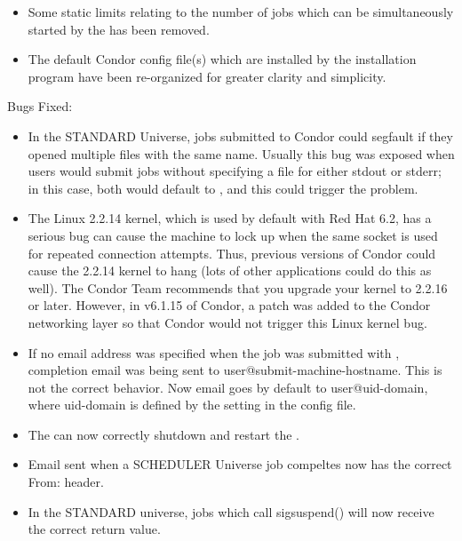 \begin{itemize}
\item Some static limits relating to the number of jobs which can be 
simultaneously started by the  has been removed.

\item The default Condor config file(s) which are installed by
the installation program have been re-organized for greater 
clarity and simplicity.  

\end{itemize}

\noindent Bugs Fixed:

\begin{itemize}

\item In the STANDARD Universe, jobs submitted to Condor could segfault
if they opened multiple files with the same name.  Usually this bug
was exposed when users would submit jobs without specifying a file
for either stdout or stderr; in this case, both would default to 
, and this could trigger the problem.

\item The Linux 2.2.14 kernel, which is used by default with Red Hat 6.2,
has a serious bug can cause the machine to lock up when 
the same socket is used for repeated connection attempts.   Thus, 
previous versions of Condor could cause the 2.2.14 kernel to hang
(lots of other applications could do this as well).  The Condor Team
recommends that you upgrade your kernel to 2.2.16 or later.  However,
in v6.1.15 of Condor, a patch was added to the Condor networking
layer so that Condor would not trigger this Linux kernel bug.

\item If no email address was specified when the job was submitted
with , completion email was being sent to 
user@submit-machine-hostname.  This is not the correct behavior.  Now 
email goes by default to user@uid-domain, where uid-domain is
defined by the  setting in the config file.

\item The  can now correctly shutdown and restart the
.

\item Email sent when a SCHEDULER Universe job compeltes now has the
correct From: header.

\item In the STANDARD universe, jobs which call sigsuspend() will 
now receive the correct return value.


\end{itemize}
